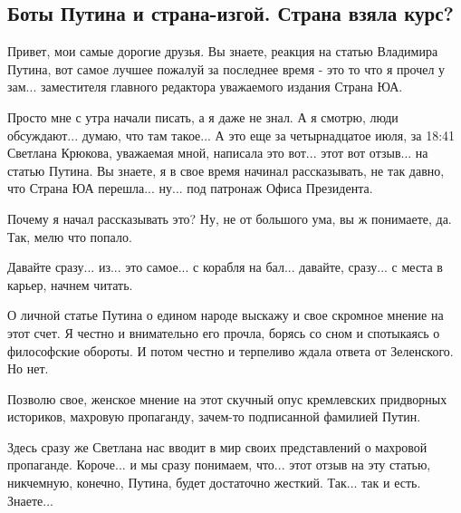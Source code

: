  
 
 
 
 
\subsection{Боты Путина и страна-изгой. Страна взяла курс?}
\label{sec:17_07_2021.youtube.sharij_anatolij.1.boty_putina_strana_izgoj}

Привет, мои самые дорогие друзья. Вы знаете, реакция на статью Владимира
Путина, вот самое лучшее пожалуй за последнее время - это то что я прочел у
зам... заместителя главного редактора уважаемого издания Страна ЮА.

Просто мне с утра начали писать, а я даже не знал. А я смотрю, люди
обсуждают... думаю, что там такое... А это еще за четырнадцатое июля, за 18:41
Светлана Крюкова, уважаемая мной, написала это вот... этот вот отзыв... на
статью Путина. Вы знаете, я в свое время начинал рассказывать, не так давно,
что Страна ЮА перешла... ну... под патронаж Офиса Президента.

Почему я начал рассказывать это? Ну, не от большого ума, вы ж понимаете, да.
Так, мелю что попало. 

Давайте сразу... из... это самое... с корабля на бал... давайте, сразу... с
места в карьер, начнем читать.

О личной статье Путина о едином народе выскажу и свое скромное мнение на этот счет.
Я честно и внимательно его прочла, борясь со сном и спотыкаясь о философские обороты.
И потом честно и терпеливо ждала ответа от Зеленского. Но нет. 

Позволю свое, женское мнение на этот скучный опус кремлевских придворных историков, 
махровую пропаганду, зачем-то подписанной фамилией Путин.

Здесь сразу же Светлана нас вводит в мир своих представлений о махровой пропаганде.
Короче... и мы сразу понимаем, что... этот отзыв на эту статью, никчемную, конечно,
Путина, будет достаточно жесткий. Так... так и есть. Знаете... 

